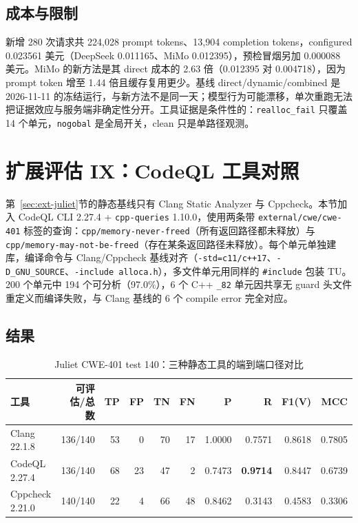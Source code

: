 \documentclass[conference]{IEEEtran}
\begin{document}
\subsection{成本与限制}

新增 280 次请求共 224{,}028 prompt tokens、13{,}904 completion tokens，configured 0.023561 美元（DeepSeek 0.011165、MiMo 0.012395），预检冒烟另加 0.000088 美元。MiMo 的新方法是其 direct 成本的 2.63 倍（0.012395 对 0.004718），因为 prompt token 增至 1.44 倍且缓存复用更少。基线 direct/dynamic/combined 是 2026-11-11 的冻结运行，与新方法不是同一天；模型行为可能漂移，单次重跑无法把证据效应与服务端非确定性分开。工具证据是条件性的：\texttt{realloc\_fail} 只覆盖 14 个单元，\texttt{nogobal} 是全局开关，clean 只是单路径观测。

\section{扩展评估 IX：CodeQL 工具对照}
\label{sec:codeql}

第~\ref{sec:ext-juliet}节的静态基线只有 Clang Static Analyzer 与 Cppcheck。本节加入 CodeQL CLI 2.27.4 + \texttt{cpp-queries} 1.10.0，使用两条带 \texttt{external/cwe/cwe-401} 标签的查询：\texttt{cpp/memory-never-freed}（所有返回路径都未释放）与 \texttt{cpp/memory-may-not-be-freed}（存在某条返回路径未释放）。每个单元单独建库，编译命令与 Clang/Cppcheck 基线对齐（\texttt{-std=c11/c++17}、\texttt{-D\_GNU\_SOURCE}、\texttt{-include alloca.h}），多文件单元用同样的 \texttt{\#include} 包装 TU。200 个单元中 194 个可分析（97.0\%），6 个 C++ \texttt{\_82} 单元因共享无 guard 头文件重定义而编译失败，与 Clang 基线的 6 个 compile error 完全对应。

\subsection{结果}

\begin{table}[t]
\caption{Juliet CWE-401 test 140：三种静态工具的端到端口径对比}
\label{tab:codeql}
\centering
\scriptsize
\setlength{\tabcolsep}{3.4pt}
\begin{tabular}{@{}lrrrrrrrrr@{}}
\toprule
工具 & 可评估/总数 & TP & FP & TN & FN & P & R & F1(V) & MCC\\
\midrule
Clang 22.1.8 & 136/140 & 53 & 0 & 70 & 17 & 1.0000 & 0.7571 & 0.8618 & 0.7805\\
CodeQL 2.27.4 & 136/140 & 68 & 23 & 47 & 2 & 0.7473 & \textbf{0.9714} & 0.8447 & 0.6739\\
Cppcheck 2.21.0 & 140/140 & 22 & 4 & 66 & 48 & 0.8462 & 0.3143 & 0.4583 & 0.3306\\
\bottomrule
\end{tabular}
\end{table}
\end{document}
